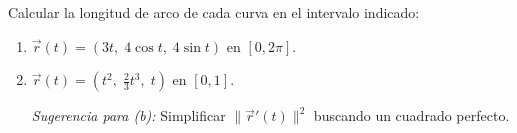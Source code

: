 Calcular la longitud de arco de cada curva en el intervalo indicado:
\begin{enumerate}
    \item $\vec{r}(t) = (3t,\; 4\cos t,\; 4\sin t)$ en $[0, 2\pi]$.
    \item $\vec{r}(t) = (t^2,\; \frac{2}{3}t^3,\; t)$ en $[0, 1]$.

    \textit{Sugerencia para (b):} Simplificar $\|\vec{r}'(t)\|^2$ buscando un cuadrado perfecto.
\end{enumerate}